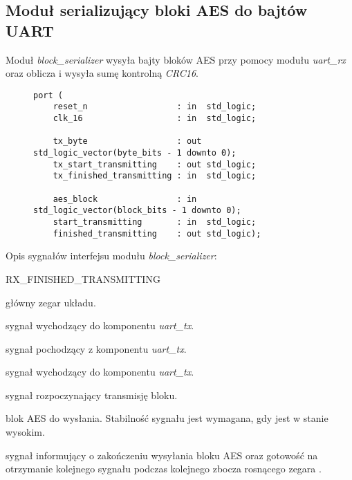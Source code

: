 \subsection{Moduł serializujący bloki AES do bajtów UART}
\label{sec:block-serializer}
Moduł \textit{block\_serializer} wysyła bajty bloków AES przy pomocy modułu \textit{uart\_rx} oraz oblicza i wysyła sumę kontrolną \textit{CRC16}.

\begin{figure}[!h]
\begin{lstlisting}[style=vhdl, captionpos=b, caption={\textit{block\_derializer} -- interfejs modułu}]
port (
	reset_n                  : in  std_logic;
	clk_16                   : in  std_logic;

	tx_byte                  : out std_logic_vector(byte_bits - 1 downto 0);
	tx_start_transmitting    : out std_logic;
	tx_finished_transmitting : in  std_logic;

	aes_block                : in  std_logic_vector(block_bits - 1 downto 0);
	start_transmitting       : in  std_logic;
	finished_transmitting    : out std_logic);
\end{lstlisting}
\end{figure}

Opis sygnałów interfejsu modułu \textit{block\_serializer}:
\begin{interface}{RX\_FINISHED\_TRANSMITTING}
	\item[\insignal{CLK\_16}] główny zegar układu.

	\item[\insignal{TX\_BYTE[7:0]}] sygnał wychodzący do komponentu \textit{uart\_tx}.
	\item[\outsignal{TX\_START\_TRANSMITTING}] sygnał pochodzący z komponentu \textit{uart\_tx}.
	\item[\insignal{TX\_FINISHED\_TRANSMITTING}] sygnał wychodzący do komponentu \textit{uart\_tx}.

	\item[\insignal{START\_TRANSMITTING}] sygnał rozpoczynający transmisję bloku.
	\item[\insignal{AES\_BLOCK[127:0]}] blok AES do wysłania. Stabilność sygnału jest wymagana, gdy  jest w stanie wysokim.
	\item[\outsignal{FINISHED\_TRANSMITTING}] sygnał informujący o zakończeniu wysyłania bloku AES oraz gotowość na otrzymanie kolejnego sygnału  podczas kolejnego zbocza rosnącego zegara .
\end{interface}

